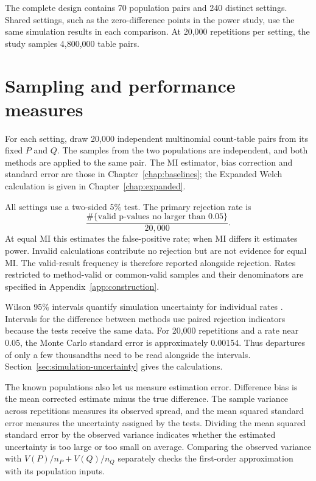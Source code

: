 The complete design contains 70 population pairs and 240 distinct settings.
Shared settings, such as the zero-difference points in the power study,
use the same simulation results in each comparison. At 20,000 repetitions
per setting, the study samples 4,800,000 table pairs.

\section{Sampling and performance measures}

For each setting, draw 20,000 independent multinomial count-table pairs
from its fixed \(P\) and \(Q\). The samples from the two populations are
independent, and both methods are applied to the same pair. The MI estimator,
bias correction and standard
error are those in Chapter~\ref{chap:baselines}; the Expanded Welch
calculation is given in Chapter~\ref{chap:expanded}.

All settings use a two-sided 5\% test. The primary rejection rate is
\begin{equation}
 \frac{\#\{\text{valid p-values no larger than }0.05\}}{20{,}000}.
 \label{eq:unconditional-rate}
\end{equation}
At equal MI this estimates the false-positive rate; when MI differs it
estimates power. Invalid calculations contribute no rejection but are not
evidence for equal MI. The valid-result frequency is therefore reported
alongside rejection. Rates restricted to method-valid or common-valid
samples and their denominators are specified in
Appendix~\ref{app:construction}.

Wilson 95\% intervals quantify simulation uncertainty for individual rates
\citep{wilson1927}. Intervals for the difference between methods use paired
rejection indicators because the tests receive the same data.
For 20,000 repetitions and a rate near 0.05, the Monte Carlo standard error
is approximately 0.00154. Thus departures of only a few thousandths need to
be read alongside the intervals. Section~\ref{sec:simulation-uncertainty}
gives the calculations.

\medskip
{}

The known populations also let us measure estimation error. Difference
bias is the mean corrected estimate minus the true difference. The sample
variance across repetitions measures its observed spread, and the mean
squared standard error measures the uncertainty assigned by the tests.
Dividing the mean squared standard error by the observed variance indicates
whether the estimated uncertainty is too large or too small on average.
Comparing the observed variance with
\(V(P)/n_P+V(Q)/n_Q\) separately checks the first-order approximation
with its population inputs.

